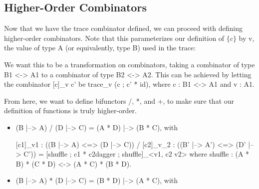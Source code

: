 \documentclass{sigplanconf}
\begin{document}
\subsection{Higher-Order Combinators}

Now that we have the trace combinator defined, we can proceed with defining
higher-order combinators. Note that this parameterizes our definition of
$\{c\}$ by {{v}}, the value of type {{A}} (or equivalently, type {{B}}) used
in the trace:


\noindent
We want this to be a transformation on combinators, taking a combinator of type
{{B1 <-> A1}} to a combinator of type {{B2 <-> A2}}. This can be achieved by
letting the combinator {{{[c]}_v c'}} be {{trace_v (c ; c' * id)}}, where
{{c : B1 <-> A1}} and {{v : A1}}.

From here, we want to define bifunctors {{/}}, {{*}}, and {{+}}, to make sure
that our definition of functions is truly higher-order.

\begin{itemize}

\item {{(B |--> A) / (D |--> C) = (A * D) |--> (B * C)}}, with

{{{[c1]}_{v1} : ((B |--> A) <=> (D |--> C)) / {[c2]}_{v_2} : ((B' |--> A') <=> (D' |--> C')) = {[shuffle ; c1 * c2dagger ; shuffle]}_{<v1, c2 v2>}}}
where
{{shuffle : (A * B) * (C * D) <-> (A * C) * (B * D)}}.

\item {{(B |--> A) * (D |--> C) = (B * D) |--> (A * C)}}, with

\end{itemize}





\end{document}
